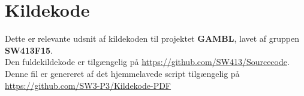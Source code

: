 \documentclass[landscape, 11pt]{report}
\begin{document}
\chapter*{Kildekode}
Dette er relevante udsnit af kildekoden til projektet \textbf{GAMBL}, lavet af gruppen \textbf{SW413F15}. \\
Den fuldekildekode er tilg\ae ngelig p\aa \hspace{5pt} \url{https://github.com/SW413/Sourcecode}. \\
Denne fil er genereret af det hjemmelavede script tilg\ae ngelig p\aa \hspace{5pt} \url{https://github.com/SW3-P3/Kildekode-PDF} \\
\tableofcontents
\clearpage

\end{document}
